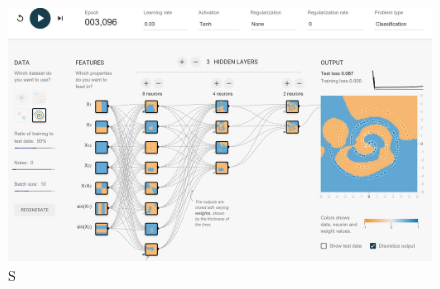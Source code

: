 \documentclass{article} %
\begin{document}
    \begin{figure}[H]
        \center
        \caption{}\label{}
        \includegraphics[width=1\textwidth]{4.JPG}S
    \end{figure}
\end{document}
